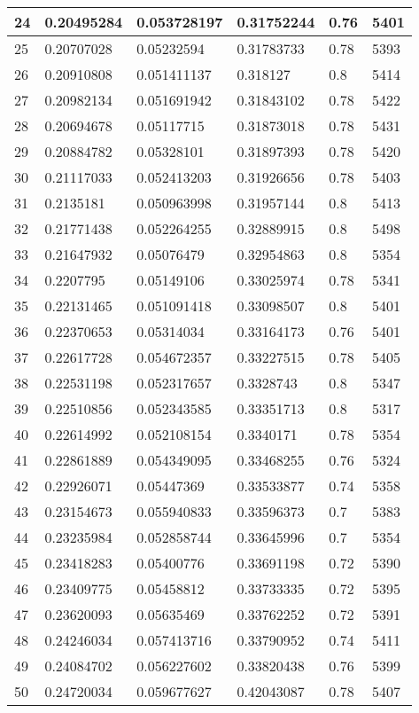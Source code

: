 \begin{longtable}{|l|l|l|l|l|l|}
24 & 0.20495284 & 0.053728197 & 0.31752244 & 0.76 & 5401 \\ \hline 
25 & 0.20707028 & 0.05232594 & 0.31783733 & 0.78 & 5393 \\ \hline 
26 & 0.20910808 & 0.051411137 & 0.318127 & 0.8 & 5414 \\ \hline 
27 & 0.20982134 & 0.051691942 & 0.31843102 & 0.78 & 5422 \\ \hline 
28 & 0.20694678 & 0.05117715 & 0.31873018 & 0.78 & 5431 \\ \hline 
29 & 0.20884782 & 0.05328101 & 0.31897393 & 0.78 & 5420 \\ \hline 
30 & 0.21117033 & 0.052413203 & 0.31926656 & 0.78 & 5403 \\ \hline 
31 & 0.2135181 & 0.050963998 & 0.31957144 & 0.8 & 5413 \\ \hline 
32 & 0.21771438 & 0.052264255 & 0.32889915 & 0.8 & 5498 \\ \hline 
33 & 0.21647932 & 0.05076479 & 0.32954863 & 0.8 & 5354 \\ \hline 
34 & 0.2207795 & 0.05149106 & 0.33025974 & 0.78 & 5341 \\ \hline 
35 & 0.22131465 & 0.051091418 & 0.33098507 & 0.8 & 5401 \\ \hline 
36 & 0.22370653 & 0.05314034 & 0.33164173 & 0.76 & 5401 \\ \hline 
37 & 0.22617728 & 0.054672357 & 0.33227515 & 0.78 & 5405 \\ \hline 
38 & 0.22531198 & 0.052317657 & 0.3328743 & 0.8 & 5347 \\ \hline 
39 & 0.22510856 & 0.052343585 & 0.33351713 & 0.8 & 5317 \\ \hline 
40 & 0.22614992 & 0.052108154 & 0.3340171 & 0.78 & 5354 \\ \hline 
41 & 0.22861889 & 0.054349095 & 0.33468255 & 0.76 & 5324 \\ \hline 
42 & 0.22926071 & 0.05447369 & 0.33533877 & 0.74 & 5358 \\ \hline 
43 & 0.23154673 & 0.055940833 & 0.33596373 & 0.7 & 5383 \\ \hline 
44 & 0.23235984 & 0.052858744 & 0.33645996 & 0.7 & 5354 \\ \hline 
45 & 0.23418283 & 0.05400776 & 0.33691198 & 0.72 & 5390 \\ \hline 
46 & 0.23409775 & 0.05458812 & 0.33733335 & 0.72 & 5395 \\ \hline 
47 & 0.23620093 & 0.05635469 & 0.33762252 & 0.72 & 5391 \\ \hline 
48 & 0.24246034 & 0.057413716 & 0.33790952 & 0.74 & 5411 \\ \hline 
49 & 0.24084702 & 0.056227602 & 0.33820438 & 0.76 & 5399 \\ \hline 
50 & 0.24720034 & 0.059677627 & 0.42043087 & 0.78 & 5407 \\ \hline 
\end{longtable}